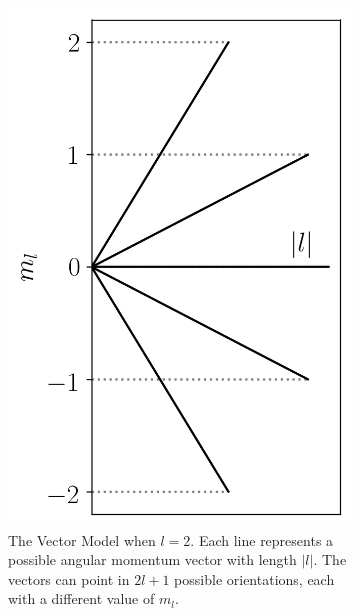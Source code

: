 \documentclass{memoir}[11pt,oneside,a4paper,openany]
\begin{document}
\begin{figure}[h]
\begin{subfigure}[b]{0.25\textwidth}
	\includegraphics[width=\textwidth]{vector_model}
		\caption{The Vector Model when $l=2$. Each line represents a possible angular momentum vector with length $\lvert l \rvert$. The vectors can point in $2l+1$ possible orientations, each with a different value of $m_l$.}\label{fig:vector_model}
	\end{subfigure}
	\qquad
	\begin{subfigure}[b]{0.25\textwidth}

\end{subfigure}
\end{figure}
\end{document}
